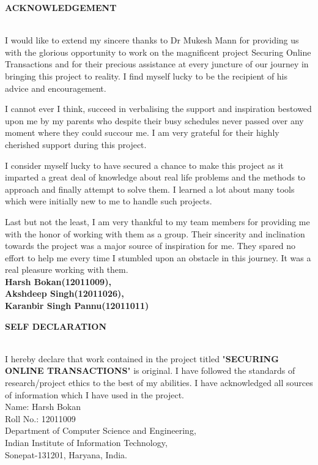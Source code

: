 \documentclass[12pt, oneside, a4paper]{article}
\begin{document}
\pagebreak
\begin{center}
    \begin{Large}\textbf{ACKNOWLEDGEMENT}\end{Large}
\end{center}\\
\vspace{1cm}
I would like to extend my sincere thanks to Dr Mukesh Mann for providing us with the glorious opportunity to work on the magnificent project Securing Online Transactions and for their precious assistance at every juncture of our journey in bringing this project to reality. I find myself lucky to be the recipient of his advice and encouragement. 

I cannot ever I think, succeed in verbalising the support and inspiration bestowed upon me by my parents who despite their busy schedules never passed over any moment where they could succour me. I am very grateful for their highly cherished support during this project.

I consider myself lucky to have secured a chance to make this project as it imparted a great deal of knowledge about real life problems and the methods to approach and finally attempt to solve them. I learned a lot about many tools which were initially new to me to handle such projects. 

Last but not the least, I am very thankful to my team members for providing me with the honor of working with them as a group. Their sincerity and inclination towards the project was a major source of inspiration for me. They spared no effort to help me every time I stumbled upon an obstacle in this journey. It was a real pleasure working with them.
\vspace{2cm}\\
\textbf{Harsh Bokan(12011009),\\ Akshdeep Singh(12011026),\\ Karanbir Singh Pannu(12011011)\\}
\setcounter{page}{2}
\pagebreak

\begin{center}
    \begin{Large}\textbf{SELF DECLARATION}\end{Large}
\end{center}\\
\vspace{1cm}
I hereby declare that work contained in the project titled "\textbf{SECURING ONLINE TRANSACTIONS}" is original. I have followed the standards of research/project ethics to the best of my abilities. I have acknowledged all sources of information which I have used in the project.
\vspace{4cm}\\
Name: Harsh Bokan\\
Roll No.: 12011009\\
Department of Computer Science and Engineering,\\
Indian Institute of Information Technology,\\
Sonepat-131201, Haryana, India.
\pagebreak
\end{document}
